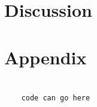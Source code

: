 \documentclass[12pt]{article}
\begin{document}
\section{Discussion}

\section*{Appendix}

\begin{verbatim}
	
	code can go here
	
\end{verbatim}
\end{document}
